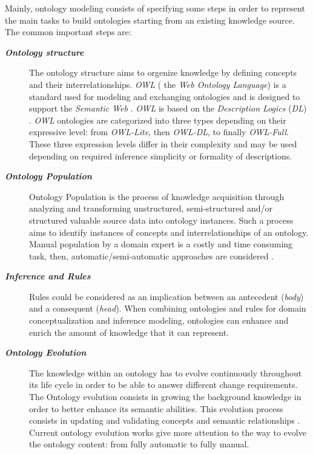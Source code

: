 		Mainly, ontology modeling consists of specifying some steps in order to represent 
		the main tasks to build ontologies starting from an existing knowledge source. 
		The common important steps are: 

		\begin{description} 
			\item[\textbf{\textit{Ontology structure}}] The ontology structure aims to 
			orgenize knowledge by defining concepts and their interrelationships.  
			\emph{OWL} ( the \emph{Web Ontology Language}) is a standard used for 
			modeling and exchanging ontologies and is designed to support the 
			\emph{Semantic Web} \citep{Staab2009}. \emph{OWL} is based on  the 
			\emph{Description Logics} (\emph{DL}) \citep{Baader2003}. \emph{OWL} ontologies 
			are categorized into three types depending on their expressive level: from \emph{OWL-Lite}, 
			then \emph{OWL-DL},  to finally \emph{OWL-Full}. These three expression levels differ 
			in their complexity and may be used depending on required inference simplicity or formality of descriptions. 

			\item[\textbf{\textit{Ontology Population}}] Ontology Population is the process of knowledge 
			acquisition through analyzing and transforming unstructured, semi-structured and/or structured valuable
			source data into ontology instances. Such a process aims to identify instances of concepts and 
			interrelationships of an ontology. Manual population by a domain expert is a costly and time consuming
			task, then, automatic/semi-automatic approaches are considered  \citep{Song2009, Faria2011}.	 

			\item[\textbf{\textit{Inference and Rules}}] Rules could be considered as an implication between 
			an antecedent (\emph{body}) and a consequent (\emph{head}). When combining ontologies and 
			rules for domain conceptualization and inference modeling, ontologies can enhance and 
			enrich the amount of knowledge that it can represent. 
		
			\item[\textbf{\textit{Ontology Evolution}}] The knowledge within an ontology has to evolve 
			continuously throughout its life cycle in order to be able to answer different change 
			requirements. The Ontology evolution consists in growing the background knowledge in order 
			to better enhance its semantic abilities. This evolution process consists in updating and 
			validating concepts and semantic relationships \citep{Gargouri2010,Paliouras2011b,Petasis2011}. 			Current ontology evolution works give more attention to the way to evolve the ontology content: 
			from fully automatic to fully manual.
		 \end{description} 	 
 
